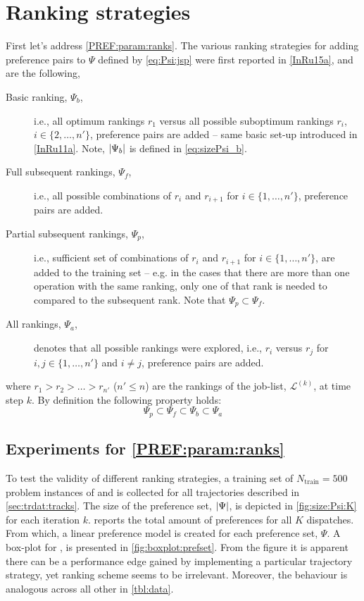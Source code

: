 \section{Ranking strategies}\label{sec:trdat:param:ranks}
First let's address \ref{PREF:param:ranks}. 
The various ranking strategies for adding preference pairs to $\Psi$ defined by 
\cref{eq:Psi:jsp} were first reported in \cref{InRu15a}, and are the following,
\begin{description}
    \item[Basic ranking, $\Psi_b$,] i.e., all optimum rankings $r_1$ versus all 
    possible suboptimum rankings $r_i$, $i\in\{2,\ldots,n'\}$, preference pairs 
    are added -- same basic set-up introduced in \cref{InRu11a}. Note, 
    $\lvert\Psi_b\rvert$ is defined in \cref{eq:sizePsi_b}.
    \item[Full subsequent rankings, $\Psi_f$,] i.e., all possible combinations 
    of $r_i$ and $r_{i+1}$ for $i\in\{1,\ldots,n'\}$, preference pairs are 
    added.
    \item[Partial subsequent rankings, $\Psi_p$,] i.e., sufficient set of 
    combinations of $r_i$ and $r_{i+1}$ for $i\in\{1,\ldots,n'\}$, are added to 
    the training set -- e.g. in the cases that there are more than one 
    operation with the same ranking, only one of that rank is needed to 
    compared to the subsequent rank. Note that $\Psi_p\subset \Psi_f$.
    \item[All rankings, $\Psi_a$,] denotes that all possible rankings were 
    explored, i.e.,
    $r_i$ versus $r_j$ for $i,j\in\{1,\ldots,n'\}$ and $i\neq j$, preference 
    pairs are added.
\end{description}
where $r_1>r_2>\ldots>r_{n'}$ ($n'\leq n$) are the rankings of the job-list, 
$\mathcal{L}^{(k)}$, at time step $k$.
By definition the following property holds:
\begin{equation}\label{eq:Psi:size}
    \Psi_p \subset \Psi_f \subset \Psi_b \subset \Psi_a
\end{equation}

\subsection*{Experiments for \ref{PREF:param:ranks}}
To test the validity of different ranking strategies, a training set of 
$N_{\text{train}}=500$ problem instances of  and 
is collected for all trajectories described in \cref{sec:trdat:tracks}. 
The size of the preference set, $\lvert\Psi\rvert$, is depicted in 
\cref{fig:size:Psi:K} for each iteration $k$.  reports the 
total amount of preferences for all $K$ dispatches.
From which, a linear preference model is created for each preference 
set, $\Psi$. A box-plot for \fullnamerho, is presented in 
\cref{fig:boxplot:prefset}. 
From the figure it is apparent there can be a performance edge gained by 
implementing a particular trajectory strategy, yet ranking scheme seems to be 
irrelevant. Moreover, the behaviour is analogous across all other 
 in \cref{tbl:data}.

